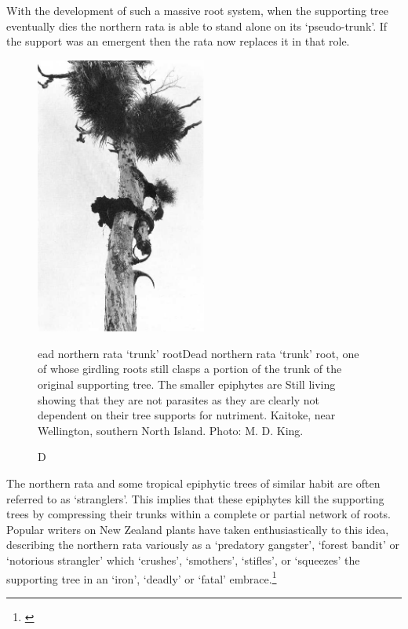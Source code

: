 With the development of such a massive root system, when the supporting tree eventually dies the northern rata is able to stand alone on its `pseudo-trunk'.
If the support was an emergent then the rata now replaces it in that role.

\begin{figure}
	\includegraphics[width=0.5\textwidth]{graphics/figure53dead-rata.jpg}
	\centering
	\caption[]Dead northern rata `trunk' root{Dead northern rata `trunk' root, one of whose girdling roots still clasps a portion of the trunk of the original supporting tree.
	The smaller epiphytes are Still living showing that they are not parasites as they are clearly not dependent on their tree supports for nutriment.
	Kaitoke, near Wellington, southern North Island.
	Photo: M. D. King.}%
	\label{fig:53dead-rata}
\end{figure}

The northern rata and some tropical epiphytic trees of similar habit are often referred to as `stranglers'.
This implies that these epiphytes kill the supporting trees by compressing their trunks within a complete or partial network of roots.
Popular writers on New Zealand plants have taken enthusiastically to this idea, describing the northern rata variously as a `predatory gangster', `forest bandit' or `notorious strangler' which `crushes', `smothers', `stifles', or `squeezes' the supporting tree in an `iron', `deadly' or `fatal' embrace.\footnote{\cite{druce1971uncle}}

